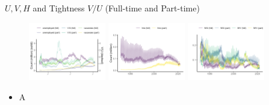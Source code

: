 \documentclass[aspectratio=169]{beamer}
\begin{document}
\begin{frame}{$U,V,H$ and Tightness $V/U$ (Full-time and Part-time)}
    \begin{figure}[!ht]
  \begin{center}
  \includegraphics[width = 0.3\textwidth]
  {figuretable/unemployed_vacancy_month_full_time_part_time.png}
  \includegraphics[width = 0.3\textwidth]
  {figuretable/hire_month_full_time_part_time.png}
  \includegraphics[width = 0.3\textwidth]
  {figuretable/job_finding_rate_worker_finding_rate_month_full_time_part_time.png}
  \end{center}
  \footnotesize
\end{figure} 
\begin{itemize}
    \item A
\end{itemize}

\end{frame}
\end{document}

